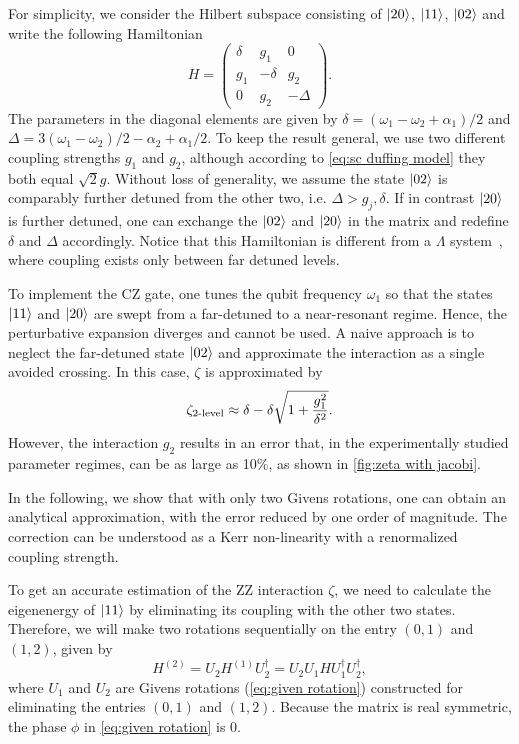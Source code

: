 \documentclass[%
 reprint,
 amsmath,amssymb,
 aps,
pra,
noeprint,
superscriptaddress,
]{revtex4-2}
\begin{document}
For simplicity, we consider the Hilbert subspace consisting of $\ket{20}$, $\ket{11}$, $\ket{02}$ and write the following Hamiltonian
\begin{equation}
H=
    \begin{pmatrix}
    \delta  & g_1 & 0 \\
  g_1& -\delta & g_2 \\
    0 & g_2 & -\Delta
    \end{pmatrix}
    .
\label{eq:sc qubit-qubit model}
\end{equation}
The parameters in the diagonal elements are given by $\delta = (\omega_1-\omega_2+\alpha_1)/2$ and  $\Delta = 3(\omega_1- \omega_2)/2 - \alpha_2+\alpha_1/2$.
To keep the result general, we use two different coupling strengths $g_1$ and $g_2$, although according to \cref{eq:sc duffing model} they both equal $\sqrt{2}g$.
Without loss of generality, we assume the state $\ket{02}$ is comparably further detuned from the other two, i.e. $\Delta > g_j, \delta$.
If in contrast $\ket{20}$ is further detuned, one can exchange the $\ket{02}$ and $\ket{20}$ in the matrix and redefine $\delta$ and $\Delta$ accordingly.
Notice that this Hamiltonian is different from a $\Lambda$ system~\cite{Brion2007}, where coupling exists only between far detuned levels.

To implement the CZ gate, one tunes the qubit frequency $\omega_1$ so that the states $\ket{11}$ and $\ket{20}$ are swept from a far-detuned to a near-resonant regime.
Hence, the perturbative expansion diverges and cannot be used.
A naive approach is to neglect the far-detuned state $\ket{02}$ and approximate the interaction as a single avoided crossing.
In this case, $\zeta$ is approximated by
\begin{equation}
    \label{eq:zeta 2 level}
    \zeta_{\textnormal{2-level}} \approx \delta - \delta\sqrt{1 + \frac{g_1^2}{\delta^2}}
    .
\end{equation}
However, the interaction $g_2$ results in an error that, in the experimentally studied parameter regimes, can be as large as 10\%, as shown in \cref{fig:zeta with jacobi}.


In the following, we show that with only two Givens rotations, one can obtain an analytical approximation, with the error reduced by one order of magnitude.
The correction can be understood as a Kerr non-linearity with a renormalized coupling strength.

To get an accurate estimation of the ZZ interaction $\zeta$, we need to calculate the eigenenergy of $\ket{11}$ by eliminating its coupling with the other two states.
Therefore, we will make two rotations sequentially on the entry $(0,1)$ and $(1,2)$, given by
\begin{equation}
    H^{(2)} = U_2 H^{(1)} U_2^{\dagger} = U_2 U_1 H U_1^{\dagger} U_2^{\dagger}
    ,
\end{equation}
where $U_1$ and $U_2$ are Givens rotations (\cref{eq:given rotation}) constructed for eliminating the entries $(0,1)$ and $(1,2)$.
Because the matrix is real symmetric, the phase $\phi$ in \cref{eq:given rotation} is 0.
\end{document}
